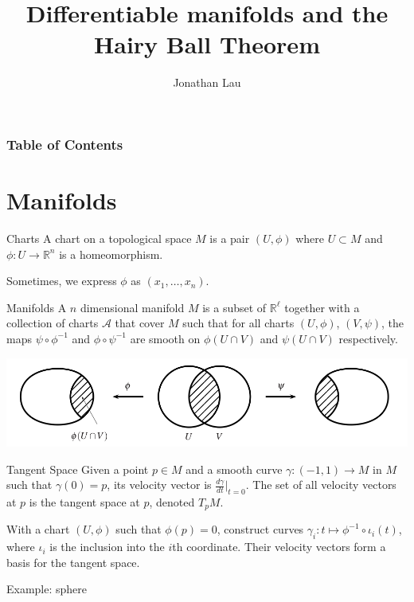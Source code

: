 \documentclass[9pt]{beamer}
\title[Differentiable manifolds and the Hairy Ball Theorem]
{Differentiable manifolds and the Hairy Ball Theorem}
\author[Jonathan Lau] %
{Jonathan Lau}
\begin{document}
	
\frame{\titlepage}

\begin{frame}
	\frametitle{Table of Contents}
	\tableofcontents
\end{frame}

\section{Manifolds}
	
\begin{frame}
    \begin{block}{Charts}
        A chart on a topological space $M$ is a pair $(U, \phi)$ where $U\subset M$ and $\phi:U\rightarrow \mathbb{R}^n$ is a homeomorphism.
    \end{block}

    Sometimes, we express $\phi$ as $(x_1, \dots, x_n)$.

    \begin{block}{Manifolds}
        A $n$ dimensional manifold $M$ is a subset of $\mathbb{R}^\ell$ together with a collection of charts $\mathcal{A}$ that cover $M$ such that for all charts $(U, \phi)$, $(V, \psi)$, the maps $\psi\circ\phi^{-1}$ and $\phi\circ\psi^{-1}$ are smooth on $\phi(U\cap V)$ and $\psi(U\cap V)$ respectively.
    \end{block}
    \includegraphics[scale=0.6]{compatible.PNG}
\end{frame}

\begin{frame}
    \begin{block}{Tangent Space}
        Given a point $p\in M$ and a smooth curve $\gamma:(-1,1)\rightarrow M$ in $M$ such that $\gamma(0)=p$, its velocity vector is $\frac{d\gamma}{dt}\vert_{t=0}$. The set of all velocity vectors at $p$ is the tangent space at $p$, denoted $T_p M$.
    \end{block}
    With a chart $(U, \phi)$ such that $\phi(p)=0$, construct curves $\gamma_i:t\mapsto \phi^{-1}\circ\iota_i(t)$, where $\iota_i$ is the inclusion into the $i$th coordinate. Their velocity vectors form a basis for the tangent space.

    Example: sphere
\end{frame}
\end{document}
